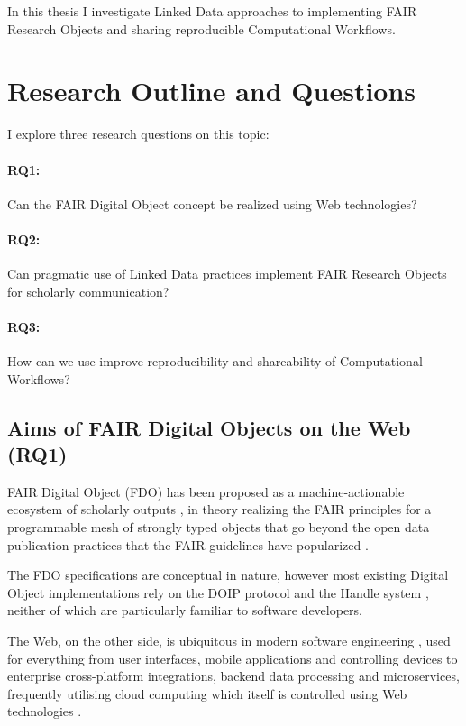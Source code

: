 In this thesis I investigate Linked Data approaches to implementing FAIR Research Objects and sharing reproducible Computational Workflows.

\section{Research Outline and Questions}

I explore three research questions on this topic:

\paragraph{RQ1:} Can the FAIR Digital Object concept be realized using Web technologies?

\paragraph{RQ2:} Can pragmatic use of Linked Data practices implement FAIR Research Objects for scholarly communication?

\paragraph{RQ3:} How can we use improve reproducibility and shareability of Computational Workflows?


\subsection{Aims of FAIR Digital Objects on the Web (RQ1)}

FAIR Digital Object (FDO) has been proposed as a machine-actionable ecosystem of scholarly outputs \cite{Schultes 2019}, in theory realizing the FAIR principles \cite{Wilkinson 2016} for a programmable mesh of strongly typed objects that go beyond the open data publication practices that the FAIR guidelines have popularized \cite{Jacobsen 2020}.

The FDO specifications \cite{fdo-Overview} are conceptual in nature, however most existing Digital Object implementations \cite{Kahn 2006} rely on the DOIP protocol \cite{DigitalObjectInterface} and the Handle system \cite{rfc3650}, neither of which are particularly familiar to software developers.

The Web, on the other side, is ubiquitous in modern software engineering \cite{Taivalsaari 2021}, used for everything from user interfaces, mobile applications and controlling devices to enterprise cross-platform integrations, backend data processing and microservices, frequently utilising cloud computing which itself is controlled using Web technologies \cite{Marinescu 2022}.


